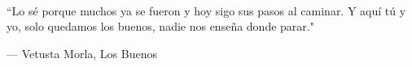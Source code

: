 
\begin{epigraphs}
\setlength{\epigraphwidth}{.6\textwidth}
\\ [4cm]
\epigraph{``Lo s\'{e} porque muchos ya se fueron y hoy sigo sus pasos al caminar. Y aqu\'{i} t\'{u} y yo, solo quedamos los buenos, nadie nos ense\~{n}a donde parar."}{--- \textup{Vetusta Morla}, Los Buenos}
\end{epigraphs}
